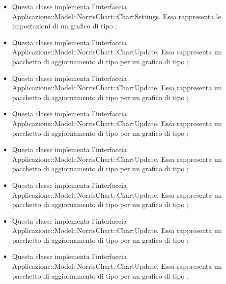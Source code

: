 \begin{itemize}
		\item {} Questa classe implementa l'interfaccia Applicazione::Model::NorrisChart::ChartSettings. Essa rappresenta le impostazioni di un grafico di tipo ;

		\item {} Questa classe implementa l'interfaccia Applicazione::Model::NorrisChart::ChartUpdate. Essa rappresenta un pacchetto di aggiornamento di tipo  per un grafico di tipo ;

		\item {} Questa classe implementa l'interfaccia Applicazione::Model::NorrisChart::ChartUpdate. Essa rappresenta un pacchetto di aggiornamento di tipo  per un grafico di tipo ;

		\item {} Questa classe implementa l'interfaccia Applicazione::Model::NorrisChart::ChartUpdate. Essa rappresenta un pacchetto di aggiornamento di tipo  per un grafico di tipo ;

		\item {} Questa classe implementa l'interfaccia Applicazione::Model::NorrisChart::ChartUpdate. Essa rappresenta un pacchetto di aggiornamento di tipo  per un grafico di tipo ;

		\item {} Questa classe implementa l'interfaccia Applicazione::Model::NorrisChart::ChartUpdate. Essa rappresenta un pacchetto di aggiornamento di tipo  per un grafico di tipo ;

		\item {} Questa classe implementa l'interfaccia Applicazione::Model::NorrisChart::ChartUpdate. Essa rappresenta un pacchetto di aggiornamento di tipo  per un grafico di tipo ;

		\item {} Questa classe implementa l'interfaccia Applicazione::Model::NorrisChart::ChartUpdate. Essa rappresenta un pacchetto di aggiornamento di tipo  per un grafico di tipo .
	\end{itemize}

